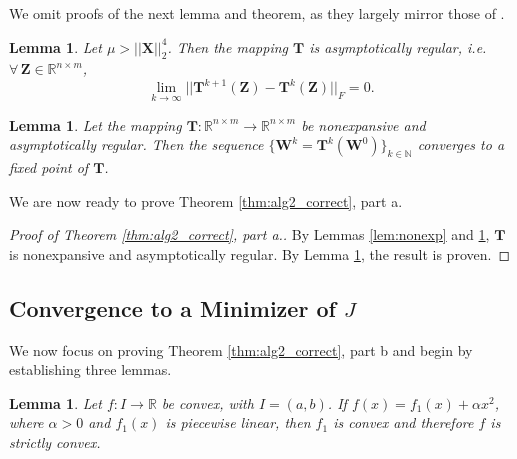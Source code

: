\documentclass[12pt]{article}
\newtheorem{lemma}[theorem]{Lemma}
\begin{document}
We omit proofs of the next lemma and theorem, as they largely mirror those of \cite{daubechies_etal_2004}.

\begin{lemma}
\label{thm:asy_reg_maintext}
    Let $\mu > ||\mathbf{X}||_2^4$.  Then the mapping $\mathbf{T}$ is asymptotically regular, i.e. $\forall \, \mathbf{Z} \in \mathbb{R}^{n \times m}$,
\[
\lim_{k \rightarrow \infty} ||\mathbf{T}^{k+1}(\mathbf{Z})-\mathbf{T}^{k}(\mathbf{Z})||_{F} = 0.
\]
\end{lemma}

\begin{lemma}
\label{thm:conv_maintext}
    Let the mapping $\mathbf{T}: \mathbb{R}^{n \times m} \rightarrow \mathbb{R}^{n \times m}$ be nonexpansive and asymptotically regular.  Then the sequence $\{\mathbf{W}^k = \mathbf{T}^k(\mathbf{W}^0)\}_{k \in \mathbb{N}}$ converges to a fixed point of $\mathbf{T}$.
\end{lemma}

We are now ready to prove Theorem \ref{thm:alg2_correct}, part a.

\begin{proof}[Proof of Theorem \ref{thm:alg2_correct}, part a.]
    By Lemmas \ref{lem:nonexp} and \ref{thm:asy_reg_maintext}, $\mathbf{T}$ is nonexpansive and asymptotically regular.  By Lemma \ref{thm:conv_maintext}, the result is proven.
\end{proof}


\subsection{Convergence to a Minimizer of $J$}

We now focus on proving Theorem \ref{thm:alg2_correct}, part b and begin by establishing three lemmas.

\begin{lemma}
\label{lemma:conv}
Let $f:I \rightarrow \mathbb{R}$ be convex, with $I=(a,b)$. If  $f(x) = f_1(x) + \alpha x^2$, where $\alpha > 0$ and $f_1(x)$ is piecewise linear, then $f_1$ is convex and therefore $f$ is strictly convex.
\end{lemma}
\end{document}
